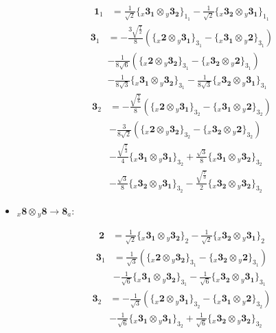 \documentclass[english]{article}
\newcommand{\rep}[1]{\mathbf{#1}}
\newcommand{\repx}[2]{{}_{#2}\mathbf{#1}}
\newcommand{\tsprodx}[2]{\repx{#1}{x}\otimes\repx{#2}{y}}
\newcommand{\subcgs}[3]{\big\{ \tsprodx{#1}{#2}\big\}^{}_{#3}}
\newcommand{\bfl}{\begin{fleqn}[25pt]}
\newcommand{\efl}{\end{fleqn}}
\begin{document}
\begin{itemize}
\bfl
\begin{align*}
\rep{1}_{1} & = \frac{1}{\sqrt{2}}\subcgs{3_{1}}{3_{2}}{1_{1}}-\frac{1}{\sqrt{2}}\subcgs{3_{2}}{3_{1}}{1_{1}}
\end{align*}
\begin{align*}
\rep{3}_{1} & = -\frac{3 \sqrt{\frac{7}{2}}}{8}\left(\subcgs{2}{3_{1}}{3_{1}}-\subcgs{3_{1}}{2}{3_{1}}\right) \\ 
 & -\frac{1}{8 \sqrt{6}}\left(\subcgs{2}{3_{2}}{3_{1}}-\subcgs{3_{2}}{2}{3_{1}}\right) \\ 
 & -\frac{1}{8 \sqrt{3}}\subcgs{3_{1}}{3_{2}}{3_{1}}-\frac{1}{8 \sqrt{3}}\subcgs{3_{2}}{3_{1}}{3_{1}}
\end{align*}
\begin{align*}
\rep{3}_{2} & = -\frac{\sqrt{\frac{7}{6}}}{8}\left(\subcgs{2}{3_{1}}{3_{2}}-\subcgs{3_{1}}{2}{3_{2}}\right) \\ 
 & -\frac{3}{8 \sqrt{2}}\left(\subcgs{2}{3_{2}}{3_{2}}-\subcgs{3_{2}}{2}{3_{2}}\right) \\ 
 & -\frac{\sqrt{\frac{7}{3}}}{4}\subcgs{3_{1}}{3_{1}}{3_{2}}+\frac{\sqrt{3}}{8}\subcgs{3_{1}}{3_{2}}{3_{2}} \\ 
 & -\frac{\sqrt{3}}{8}\subcgs{3_{2}}{3_{1}}{3_{2}}-\frac{\sqrt{\frac{7}{3}}}{2}\subcgs{3_{2}}{3_{2}}{3_{2}}
\end{align*}
\efl
\item $\tsprodx{8}{8}\to\rep{8}_{a}$:
\bfl
\begin{align*}
\rep{2} & = \frac{1}{\sqrt{2}}\subcgs{3_{1}}{3_{2}}{2}-\frac{1}{\sqrt{2}}\subcgs{3_{2}}{3_{1}}{2}
\end{align*}
\begin{align*}
\rep{3}_{1} & = \frac{1}{\sqrt{3}}\left(\subcgs{2}{3_{2}}{3_{1}}-\subcgs{3_{2}}{2}{3_{1}}\right) \\ 
 & -\frac{1}{\sqrt{6}}\subcgs{3_{1}}{3_{2}}{3_{1}}-\frac{1}{\sqrt{6}}\subcgs{3_{2}}{3_{1}}{3_{1}}
\end{align*}
\begin{align*}
\rep{3}_{2} & = -\frac{1}{\sqrt{3}}\left(\subcgs{2}{3_{1}}{3_{2}}-\subcgs{3_{1}}{2}{3_{2}}\right) \\ 
 & -\frac{1}{\sqrt{6}}\subcgs{3_{1}}{3_{1}}{3_{2}}+\frac{1}{\sqrt{6}}\subcgs{3_{2}}{3_{2}}{3_{2}}
\end{align*}
\efl
\end{itemize}
\end{document}
